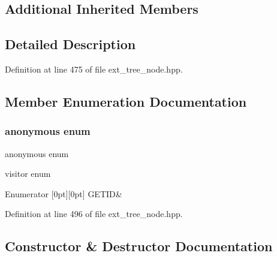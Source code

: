 \subsection*{Additional Inherited Members}


\subsection{Detailed Description}


Definition at line 475 of file ext\+\_\+tree\+\_\+node.\+hpp.



\subsection{Member Enumeration Documentation}
\mbox{\label{structomp__target__pragma_a622abd9cbbfe6023aee7a4c1f380305d}} 
\subsubsection{\texorpdfstring{anonymous enum}{anonymous enum}}
{\footnotesize\ttfamily anonymous enum}



visitor enum 

\begin{DoxyEnumFields}{Enumerator}
[0pt][0pt]{}\mbox{\label{structomp__target__pragma_a622abd9cbbfe6023aee7a4c1f380305da600b22a4d6e666417d4383b46ded575b}} 
G\+E\+T\+ID&\\
\hline

\end{DoxyEnumFields}


Definition at line 496 of file ext\+\_\+tree\+\_\+node.\+hpp.



\subsection{Constructor \& Destructor Documentation}
\mbox{\label{structomp__target__pragma_a55b5a159b5535e6c836ac8aaf78e8d09}} 
